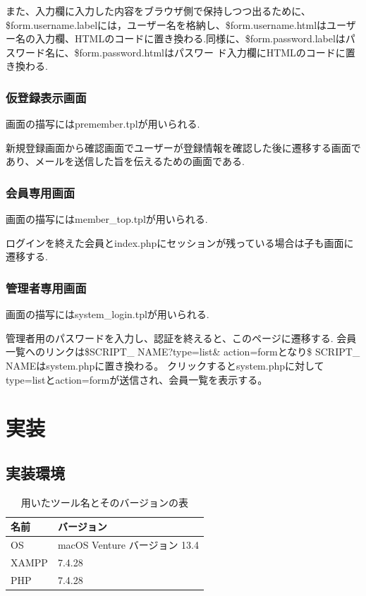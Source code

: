 \documentclass[submit,techrep]{ipsj}
\begin{document}
また、入力欄に入力した内容をブラウザ側で保持しつつ出るために、\$form.username.labelには，ユーザー名を格納し、\$form.username.htmlはユーザー名の入力欄、HTMLのコードに置き換わる.同様に、\$form.password.labelはパスワード名に、\$form.password.htmlはパスワー ド入力欄にHTMLのコードに置き換わる.

\subsubsection{仮登録表示画面}
画面の描写にはpremember.tplが用いられる.

新規登録画面から確認画面でユーザーが登録情報を確認した後に遷移する画面であり、メールを送信した旨を伝えるための画面である.

\subsubsection{会員専用画面}
画面の描写にはmember\_top.tplが用いられる.

ログインを終えた会員とindex.phpにセッションが残っている場合は子も画面に遷移する.

\subsubsection{管理者専用画面}
画面の描写にはsystem\_login.tplが用いられる.

管理者用のパスワードを入力し、認証を終えると、このページに遷移する.
会員一覧へのリンクは\$SCRIPT\_ NAME?type=list\& action=formとなり\$ SCRIPT\_ NAMEはsystem.phpに置き換わる。 クリックするとsystem.phpに対してtype=listとaction=formが送信され、会員一覧を表示する。

\section{実装}

\subsection{実装環境}
\begin{table}[h]
 \caption{用いたツール名とそのバージョンの表}
 \label{table:SpeedOfLight}
 \centering
  \begin{tabular}{ll}
   \hline
   名前 & バージョン  \\
   \hline \hline
  OS & macOS Venture バージョン 13.4 \\
  XAMPP &  7.4.28 \\
  PHP & 7.4.28 \\

   \hline
  \end{tabular}
\end{table}
\end{document}
